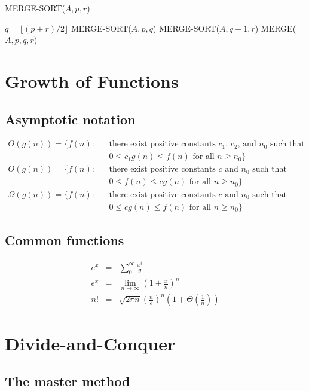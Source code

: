 \documentclass[12pt]{article}
\begin{document}
MERGE-SORT($A, p, r$)
\begin{algorithmic}[1]
	\State $q = \lfloor (p+r)/2 \rfloor$
        \State MERGE-SORT($A, p, q$)
        \State MERGE-SORT($A, q+1, r$)
        \State MERGE($A, p, q, r$)
\EndIf
\end{algorithmic}

\section{Growth of Functions}

\subsection{Asymptotic notation}

\begin{eqnarray*}
  \Theta (g(n)) = \{ f(n): && \text{there exist positive constants
    $c_1$, $c_2$, and $n_0$ such that} \\
  && 0 \le c_1 g(n) \le f(n) \text{ for all } n \ge n_0 \} \\
  O(g(n)) = \{ f(n): && \text{there exist positive constants
    $c$ and $n_0$ such that} \\
  && 0 \le f(n) \le cg(n) \text{ for all } n \ge n_0 \} \\
  \Omega (g(n)) = \{ f(n): && \text{there exist positive constants
    $c$ and $n_0$ such that} \\
  && 0 \le cg(n) \le f(n) \text{ for all } n \ge n_0 \}
\end{eqnarray*}

\subsection{Common functions}

\begin{eqnarray*}
  e^x &=& \sum_0^{\infty} \frac {x^i}{i!} \\
  e^x &=& \lim_{n \rightarrow \infty} (1 + \frac {x}{n})^n \\
  n!  &=& \sqrt {2 \pi n} \left(\frac {n}{e} \right)^n 
          \left( 1 + \Theta \left( \frac {1}{n} \right) \right)
\end{eqnarray*}

\section{Divide-and-Conquer}

\subsection{The master method}
\end{document}
